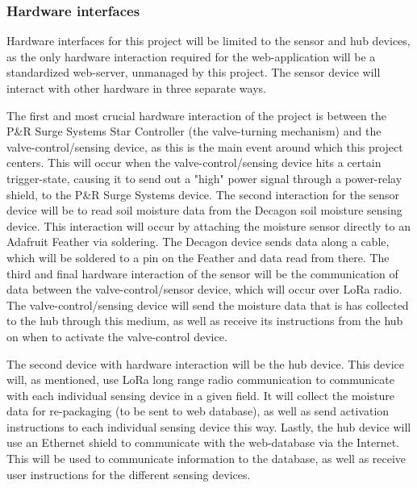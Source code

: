 \documentclass[onecolumn, draftclsnofoot,10pt, compsoc]{IEEEtran}
\begin{document}
	\subsubsection{Hardware interfaces}
	Hardware interfaces for this project will be limited to the sensor and hub devices, as the only hardware interaction required for the web-application will be a standardized web-server, unmanaged by this project.
	The sensor device will interact with other hardware in three separate ways.\par
	The first and most crucial hardware interaction of the project is between the P\&R Surge Systems Star Controller (the valve-turning mechanism) and the valve-control/sensing device, as this is the main event around which this project centers.
	This will occur when the valve-control/sensing device hits a certain trigger-state, causing it to send out a "high" power signal through a power-relay shield, to the P\&R Surge Systems device.
	The second interaction for the sensor device will be to read soil moisture data from the Decagon soil moisture sensing device.
	This interaction will occur by attaching the moisture sensor directly to an Adafruit Feather via soldering.
	The Decagon device sends data along a cable, which will be soldered to a pin on the Feather and data read from there.
	The third and final hardware interaction of the sensor will be the communication of data between the valve-control/sensor device, which will occur over LoRa radio.
	The valve-control/sensing device will send the moisture data that is has collected to the hub through this medium, as well as receive its instructions from the hub on when to activate the valve-control device.\par
	The second device with hardware interaction will be the hub device.
	This device will, as mentioned, use LoRa long range radio communication to communicate with each individual sensing device in a given field.
	It will collect the moisture data for re-packaging (to be sent to web database), as well as send activation instructions to each individual sensing device this way.
	Lastly, the hub device will use an Ethernet shield to communicate with the web-database via the Internet.
	This will be used to communicate information to the database, as well as receive user instructions for the different sensing devices.
	
\end{document}
